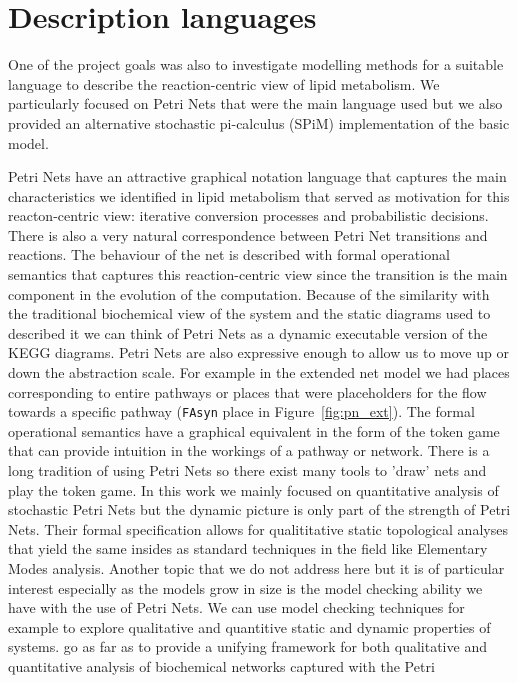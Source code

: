 \section{Description languages}
One of the project goals was also to investigate modelling methods
for a suitable language to describe the reaction-centric view of lipid
metabolism. We particularly focused on Petri Nets that were the main
language used but we also provided an alternative stochastic
pi-calculus (SPiM) implementation of the basic model.

Petri Nets have an attractive graphical notation language that
captures the main
characteristics we identified in lipid metabolism that served as
motivation for this reacton-centric view: iterative conversion
processes and probabilistic decisions. There is also a very natural
correspondence between Petri Net transitions and reactions. The
behaviour of the net is described with formal operational semantics
that captures this reaction-centric view since the transition is the
main component in the evolution of the computation. Because of the
similarity with the traditional biochemical view of the system and the
static diagrams used to described it we can think of Petri Nets as a
dynamic executable version of the KEGG diagrams. Petri Nets are also
expressive enough to allow us to move up or down the abstraction
scale. For example in the extended net model we had places
corresponding to entire pathways or places that were placeholders for
the flow towards a specific pathway (\texttt{FAsyn} place in
Figure~\ref{fig:pn_ext}). The formal operational semantics have a
graphical equivalent in the form of the token game that can provide
intuition in the workings of a pathway or network. There is a long
tradition of using Petri Nets so there exist many tools to 'draw' nets
and play the token game. In this work we mainly focused on
quantitative analysis of stochastic Petri Nets but the dynamic picture
is only part of the strength of Petri Nets. Their formal specification
allows for qualititative static topological analyses that yield the
same insides as standard techniques in the field like Elementary Modes
analysis. Another topic that we do not address here but it is of
particular interest especially as the models grow in size is the model
checking ability we have with the use of Petri Nets. We can use model
checking techniques for example to explore qualitative and quantitive
static and dynamic properties of systems. \citet{gilbert2007unifying}
go as far as to provide a unifying framework for both qualitative and
quantitative analysis of biochemical networks captured with the Petri
